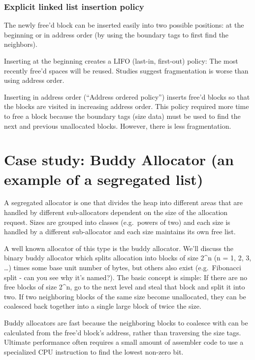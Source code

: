 \subsubsection{Explicit linked list insertion policy}

The newly free'd block can be inserted easily into two possible positions: at the beginning or in address order (by using the boundary tags to first find the neighbors).

Inserting at the beginning creates a LIFO (last-in, first-out) policy: The most recently free'd spaces will be reused. Studies suggest fragmentation is worse than using address order.

Inserting in address order (``Address ordered policy'') inserts free'd blocks so that the blocks are visited in increasing address order. This policy required more time to free a block because the boundary tags (size data) must be used to find the next and previous unallocated blocks. However, there is less fragmentation.

\section{Case study: Buddy Allocator (an example of a segregated list)}

A segregated allocator is one that divides the heap into different areas that are handled by different sub-allocators dependent on the size of the allocation request. Sizes are grouped into classes (e.g.~powers of two) and each size is handled by a different sub-allocator and each size maintains its own free list.

A well known allocator of this type is the buddy allocator. We'll discuss the binary buddy allocator which splits allocation into blocks of size 2\^{}n (n = 1, 2, 3, \ldots{}) times some base unit number of bytes, but others also exist (e.g.~Fibonacci split - can you see why it's named?). The basic concept is simple: If there are no free blocks of size 2\^{}n, go to the next level and steal that block and split it into two. If two neighboring blocks of the same size become unallocated, they can be coalesced back together into a single large block of twice the size.

Buddy allocators are fast because the neighboring blocks to coalesce with can be calculated from the free'd block's address, rather than traversing the size tags. Ultimate performance often requires a small amount of assembler code to use a specialized CPU instruction to find the lowest non-zero bit.

